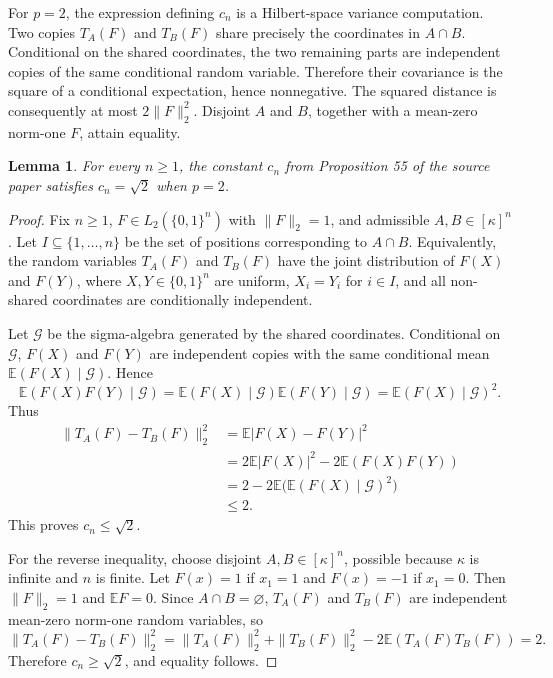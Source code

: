 \documentclass[11pt]{article}
\newtheorem{lemma}{Lemma}
\newcommand{\kappaCard}{\kappa}
\begin{document}
For \(p=2\), the expression defining \(c_n\) is a Hilbert-space variance computation.  Two copies \(T_A(F)\) and \(T_B(F)\) share precisely the coordinates in \(A\cap B\).  Conditional on the shared coordinates, the two remaining parts are independent copies of the same conditional random variable.  Therefore their covariance is the square of a conditional expectation, hence nonnegative.  The squared distance is consequently at most \(2\|F\|_2^2\).  Disjoint \(A\) and \(B\), together with a mean-zero norm-one \(F\), attain equality.

\begin{lemma}\label{lem:l2constant}
For every \(n\geq 1\), the constant \(c_n\) from Proposition 55 of the source paper satisfies \(c_n=\sqrt 2\) when \(p=2\).
\end{lemma}

\begin{proof}
Fix \(n\geq 1\), \(F\in L_2(\{0,1\}^n)\) with \(\|F\|_2=1\), and admissible \(A,B\in[\kappaCard]^n\).  Let \(I\subseteq\{1,\ldots,n\}\) be the set of positions corresponding to \(A\cap B\).  Equivalently, the random variables \(T_A(F)\) and \(T_B(F)\) have the joint distribution of \(F(X)\) and \(F(Y)\), where \(X,Y\in\{0,1\}^n\) are uniform, \(X_i=Y_i\) for \(i\in I\), and all non-shared coordinates are conditionally independent.

Let \(\mathcal G\) be the sigma-algebra generated by the shared coordinates.  Conditional on \(\mathcal G\), \(F(X)\) and \(F(Y)\) are independent copies with the same conditional mean \(\mathbb E(F(X)\mid\mathcal G)\).  Hence
\[
 \mathbb E(F(X)F(Y)\mid\mathcal G)
 = \mathbb E(F(X)\mid\mathcal G)\mathbb E(F(Y)\mid\mathcal G)
 = \mathbb E(F(X)\mid\mathcal G)^2.
\]
Thus
\[
\begin{aligned}
 \|T_A(F)-T_B(F)\|_2^2
 &= \mathbb E|F(X)-F(Y)|^2 \\
 &= 2\mathbb E|F(X)|^2 - 2\mathbb E(F(X)F(Y)) \\
 &= 2 - 2\mathbb E\bigl(\mathbb E(F(X)\mid\mathcal G)^2\bigr) \\
 &\leq 2.
\end{aligned}
\]
This proves \(c_n\leq \sqrt2\).

For the reverse inequality, choose disjoint \(A,B\in[\kappaCard]^n\), possible because \(\kappaCard\) is infinite and \(n\) is finite.  Let \(F(x)=1\) if \(x_1=1\) and \(F(x)=-1\) if \(x_1=0\).  Then \(\|F\|_2=1\) and \(\mathbb E F=0\).  Since \(A\cap B=\varnothing\), \(T_A(F)\) and \(T_B(F)\) are independent mean-zero norm-one random variables, so
\[
 \|T_A(F)-T_B(F)\|_2^2
 = \|T_A(F)\|_2^2+\|T_B(F)\|_2^2
   -2\mathbb E(T_A(F)T_B(F))
 =2.
\]
Therefore \(c_n\geq\sqrt2\), and equality follows.
\end{proof}
\end{document}
